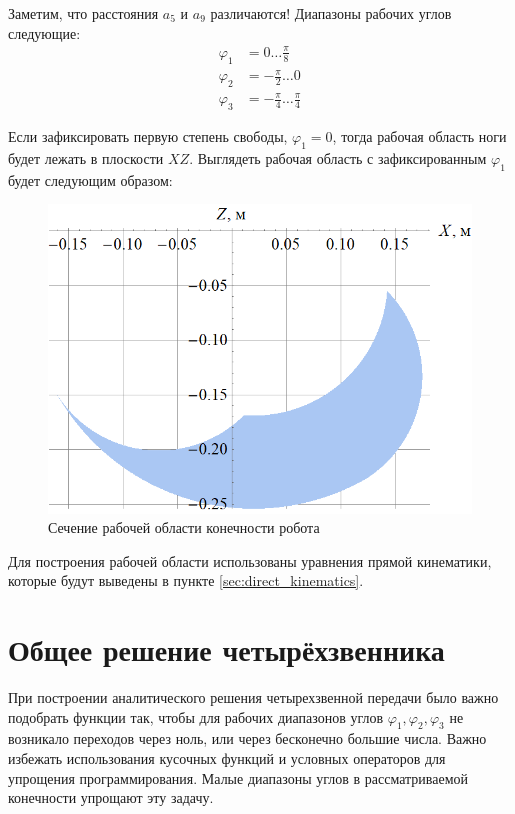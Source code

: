 Заметим, что расстояния $ a_5 $ и $ a_9 $ различаются! Диапазоны рабочих углов следующие:
\begin{align*}
    \varphi_1&=0 \dots \frac \pi 8 \\
    \varphi_2&=-\frac \pi 2 \dots 0 \\
    \varphi_3&=-\frac \pi 4 \dots \frac \pi 4
\end{align*}

Если зафиксировать первую степень свободы, $ \varphi_1 = 0 $, тогда рабочая область ноги будет лежать в плоскости $ XZ $. Выглядеть рабочая область с зафиксированным $ \varphi_1 $ будет следующим образом:
\begin{figure}[h]
    \centering
    \includegraphics[scale=0.5]{chapter_kinematics/figure3.png}
    \caption{Сечение рабочей области конечности робота}
    \label{}
\end{figure}

Для построения рабочей области использованы уравнения прямой кинематики, которые будут выведены в пункте \ref{sec:direct_kinematics}.

\section{Общее решение четырёхзвенника} \label{sec:pre_direct_kin}

При построении аналитического решения четырехзвенной передачи было важно подобрать функции так, чтобы для рабочих диапазонов углов $ \varphi_1, \varphi_2, \varphi_3 $ не возникало переходов через ноль, или через бесконечно большие числа. Важно избежать использования кусочных функций и условных операторов для упрощения программирования.
Малые диапазоны углов в рассматриваемой конечности упрощают эту задачу.

